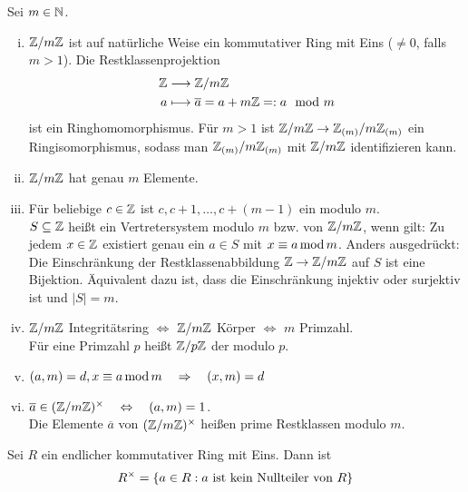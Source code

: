\begin{falko} \label{F3.6}
	Sei $m \in \mathbb{N}$. 
	\begin{enumerate}[(i)]
		\item $\mathbb{Z}/m\mathbb{Z}$ ist auf natürliche Weise ein kommutativer Ring mit Eins ($\neq 0$, falls $m > 1$). Die Restklassenprojektion
		\begin{equation}
		\begin{aligned}
			\mathbb{Z} &\longrightarrow \mathbb{Z}/m\mathbb{Z} \\
			a &\longmapsto \overline{a} = a+m\mathbb{Z} =: a \mod m
		\end{aligned}
		\end{equation}
		ist ein Ringhomomorphismus. Für $m > 1$ ist $\mathbb{Z}/m\mathbb{Z} \rightarrow \mathbb{Z}_{(m)}/m\mathbb{Z}_{(m)}$ ein Ringisomorphismus, sodass man $\mathbb{Z}_{(m)}/m\mathbb{Z}_{(m)}$ mit $\mathbb{Z}/m\mathbb{Z}$ identifizieren kann.
		\item $\mathbb{Z}/m\mathbb{Z}$ hat genau $m$ Elemente.
		\item Für beliebige $c \in \mathbb{Z}$ ist $c, c+1, \dots, c+(m-1)$ ein  modulo $m$. \\
		$S \subseteq \mathbb{Z}$ heißt ein Vertretersystem modulo $m$ bzw. von $\mathbb{Z}/m\mathbb{Z}$, wenn gilt: Zu jedem $x \in \mathbb{Z}$ existiert genau ein $a \in S$ mit $x \equiv a \operatorname{mod} m$. Anders ausgedrückt: Die Einschränkung der Restklassenabbildung $\mathbb{Z} \rightarrow \mathbb{Z}/m\mathbb{Z}$ auf $S$ ist eine Bijektion. Äquivalent dazu ist, dass die Einschränkung injektiv oder surjektiv ist und $|S|=m$.
		\item $\mathbb{Z}/m\mathbb{Z}$ Integritätsring \quad $\Leftrightarrow$ \quad $\mathbb{Z}/m\mathbb{Z}$ Körper \quad $\Leftrightarrow$ \quad $m$ Primzahl. \\
		Für eine Primzahl $p$ heißt $\mathbb{Z}/p\mathbb{Z}$ der  modulo $p$.
		\item $(a,m) = d, x \equiv a \operatorname{mod} m \quad \Rightarrow \quad (x,m) = d$
		\item $\overline{a} \in (\mathbb{Z}/m\mathbb{Z})^\times \quad \Leftrightarrow \quad (a,m) = 1$. \\
		Die Elemente $\overline{a}$ von $(\mathbb{Z}/m\mathbb{Z})^\times$ heißen prime Restklassen modulo $m$.
	\end{enumerate}
\end{falko}

\begin{lemma}
	Sei $R$ ein endlicher kommutativer Ring mit Eins. Dann ist
	\[ R^\times = \{a \in R : a \text{ ist kein Nullteiler von } R\} \]
\end{lemma}

